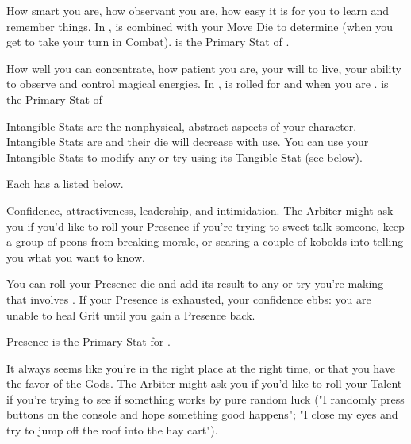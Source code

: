 {How smart you are, how observant you are, how easy it is for you to learn and remember things. In , \INT is combined with your Move Die to determine  (when you get to take your turn in Combat). \INT is the Primary Stat of .  



How well you can concentrate, how patient you are, your will to live, your ability to observe and control magical energies.  In , \FOC is rolled for  and when you are .  \FOC is the Primary Stat of 

\cbreak




Intangible Stats are the nonphysical, abstract aspects of your character. Intangible Stats are \UD and their die will decrease with use.  You can use your Intangible Stats to modify any \RO or \RB try using its  Tangible Stat (see below).

Each  has a  listed below.



Confidence, attractiveness, leadership, and intimidation. The Arbiter might ask you if you'd like to roll your Presence \UD if you're trying to sweet talk someone, keep a group of peons from breaking morale, or scaring a couple of kobolds into telling you what you want to know. 

You can roll your Presence die and add its result to any \RO or \RB try you're making that involves \VIG.  If your Presence is exhausted, your confidence ebbs: you are unable to heal Grit until you gain a Presence \UD back.

Presence is the Primary Stat for .



It always seems like you're in the right place at the right time, or that you have the favor of the Gods. The Arbiter might ask you if you'd like to roll your Talent \UD if you're trying to see if something works by pure random luck ("I randomly press buttons on the console and hope something good happens"; "I close my eyes and try to jump off the roof into the hay cart").  

}
